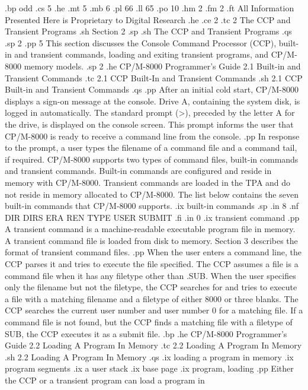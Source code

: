 .bp odd
.cs 5
.he
.mt 5
.mb 6
.pl 66
.ll 65
.po 10
.hm 2
.fm 2
.ft All Information Presented Here is Proprietary to Digital Research
.he
.ce 2
.tc 2  The CCP and Transient Programs
.sh
Section 2
.sp 
.sh
The CCP and Transient Programs 
.qs
.sp 2
.pp 5
This section discusses the Console Command
Processor (CCP), built-in and transient commands, loading and exiting 
transient programs, and CP/M-8000 memory models. 
.sp 2
.he CP/M-8000 Programmer's Guide  2.1  Built-in and Transient Commands
.tc    2.1  CCP Built-In and Transient Commands
.sh
2.1  CCP Built-in and Transient Commands
.qs
.pp
After an initial cold start, CP/M-8000 displays a sign-on message
at the console.  Drive A, containing the system disk, is logged
in automatically.  The standard prompt (>), preceded by the letter
A for the drive, is displayed on the console screen.  This prompt
informs the user that CP/M-8000 is ready to receive a command line
from the console. 
.pp
In response to the prompt, a user types the filename of a command
file and a command tail, if required.  CP/M-8000 supports two types
of command files, built-in commands and transient commands.
Built-in commands are configured and reside in memory with
CP/M-8000.  Transient commands are loaded in the TPA and do not
reside in memory allocated to CP/M-8000.  The list below contains
the seven built-in commands that CP/M-8000 supports. 
.ix built-in commands
.sp
.in 8
.nf
DIR  
DIRS  
ERA  
REN  
TYPE  
USER  
SUBMIT
.fi
.in 0
.ix transient command
.pp
A transient command is a machine-readable executable program file 
in memory.  A transient command file is loaded from disk to memory.  
Section 3 describes the format of transient command files.
.pp
When the user enters a command line, the CCP parses it and tries to execute
the file specified.  The CCP assumes a file is a command file when it has
any filetype other than .SUB.  When the user specifies only the filename but
not the filetype, the CCP searches for and tries to execute a file with a
matching filename and a filetype of either 8000 or three blanks.  The CCP
searches the current user number and user number 0 for a matching file.  If
a command file is not found, but the CCP finds a matching file with a
filetype of SUB, the CCP executes it as a submit file. 
.bp
.he CP/M-8000 Programmer's Guide      2.2  Loading A Program In Memory
.tc 2.2  Loading A Program In Memory
.sh
2.2  Loading A Program In Memory
.qs
.ix loading a program in memory
.ix program segments
.ix a user stack
.ix base page
.ix program, loading
.pp
Either the CCP or a transient program can load a program in
